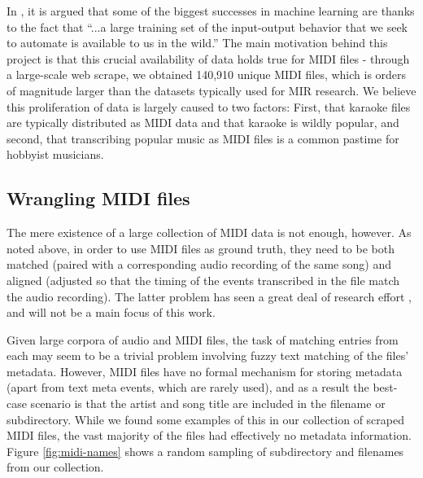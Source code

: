 \documentclass{article}
\begin{document}
In \cite{halevy2009unreasonable}, it is argued that some of the biggest successes in machine learning are thanks to the fact that ``...a large training set of the input-output behavior that we seek to automate is available to us in the wild.''
The main motivation behind this project is that this crucial availability of data holds true for MIDI files - through a large-scale web scrape, we obtained 140,910 unique MIDI files, which is orders of magnitude larger than the datasets typically used for MIR research.
We believe this proliferation of data is largely caused to two factors: First, that karaoke files are typically distributed as MIDI data and that karaoke is wildly popular, and second, that transcribing popular music as MIDI files is a common pastime for hobbyist musicians.

\subsection{Wrangling MIDI files}

The mere existence of a large collection of MIDI data is not enough, however.
As noted above, in order to use MIDI files as ground truth, they need to be both matched (paired with a corresponding audio recording of the same song) and aligned (adjusted so that the timing of the events transcribed in the file match the audio recording).
The latter problem has seen a great deal of research effort \cite{ewert2012towards, turetsky2003ground}, and will not be a main focus of this work.

Given large corpora of audio and MIDI files, the task of matching entries from each may seem to be a trivial problem involving fuzzy text matching of the files' metadata.
However, MIDI files have no formal mechanism for storing metadata (apart from text meta events, which are rarely used), and as a result the best-case scenario is that the artist and song title are included in the filename or subdirectory.
While we found some examples of this in our collection of scraped MIDI files, the vast majority of the files had effectively no metadata information.
Figure \ref{fig:midi-names} shows a random sampling of subdirectory and filenames from our collection.
\end{document}
